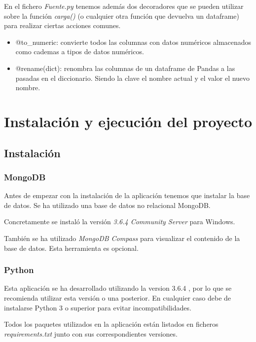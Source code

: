 En el fichero \textit{Fuente.py} tenemos además dos decoradores que se pueden utilizar sobre la función \textit{carga()} (o cualquier otra función que devuelva un dataframe) para realizar ciertas acciones comunes.

\begin{itemize}
	\item @to\_numeric: convierte todos las columnas con datos numéricos almacenados como cademas a tipos de datos numéricos.
	\item @rename(dict): renombra las columnas de un dataframe de Pandas a las pasadas en el diccionario. Siendo la clave el nombre actual y el valor el nuevo nombre.
\end{itemize}

\section{Instalación y ejecución del proyecto} \label{instalacionprogramador}

\subsection{Instalación}

\subsubsection{MongoDB}

Antes de empezar con la instalación de la aplicación tenemos que instalar la base de datos.
Se ha utilizado una base de datos no relacional MongoDB.

Concretamente se instaló la versión \textit{3.6.4 Community Server} \cite{misc:mongodb} para Windows.

También se ha utilizado \textit{MongoDB Compass} \cite{misc:mongodb} para visualizar el contenido de la base de datos. Esta herramienta es opcional.

\subsubsection{Python}

Esta aplicación se ha desarrollado utilizando la version 3.6.4 \cite{misc:python3}, por lo que se recomienda utilizar esta versión o una posterior. En cualquier caso debe de instalarse Python 3 o superior para evitar incompatibilidades.

Todos los paquetes utilizados en la aplicación están listados en ficheros \textit{requirements.txt} junto con sus correspondientes versiones.

